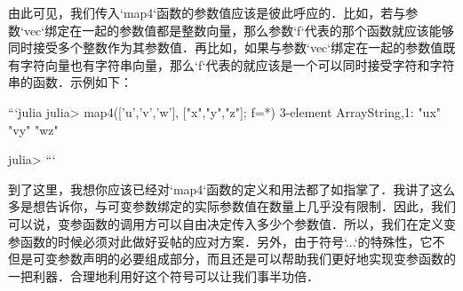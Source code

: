 由此可见，我们传入`map4`函数的参数值应该是彼此呼应的．比如，若与参数`vec`绑定在一起的参数值都是整数向量，那么参数`f`代表的那个函数就应该能够同时接受多个整数作为其参数值．再比如，如果与参数`vec`绑定在一起的参数值既有字符向量也有字符串向量，那么`f`代表的就应该是一个可以同时接受字符和字符串的函数．示例如下：

```julia
julia> map4(['u','v','w'], ["x","y","z"]; f=*)
3-element Array{String,1}:
 "ux"
 "vy"
 "wz"

julia> 
```

到了这里，我想你应该已经对`map4`函数的定义和用法都了如指掌了．我讲了这么多是想告诉你，与可变参数绑定的实际参数值在数量上几乎没有限制．因此，我们可以说，变参函数的调用方可以自由决定传入多少个参数值．所以，我们在定义变参函数的时候必须对此做好妥帖的应对方案．另外，由于符号`...`的特殊性，它不但是可变参数声明的必要组成部分，而且还是可以帮助我们更好地实现变参函数的一把利器．合理地利用好这个符号可以让我们事半功倍．